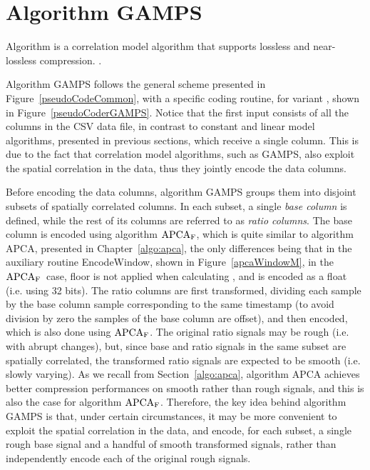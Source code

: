 
\section{Algorithm GAMPS}
\label{algo:gamps}
\newcommand{\apcaF}{$\textnormal{APCA}_\textnormal{F}$}


\vspace{-5pt}
Algorithm \textit{\GAMPSfull} \cite{coder:gamps} is a correlation model algorithm that supports lossless and near-lossless compression. \WindowParam {}.


Algorithm GAMPS follows the general scheme presented in Figure~\ref{pseudoCodeCommon}, with a specific coding routine, for variant \maskalgo, shown in Figure~\ref{pseudoCoderGAMPS}. Notice that the first input consists of all the columns in the CSV data file, in contrast to constant and linear model algorithms, presented in previous sections, which receive a single column. This is due to the fact that correlation model algorithms, such as GAMPS, also exploit the spatial correlation in the data, thus they jointly encode the data columns. 


Before encoding the data columns, algorithm GAMPS groups them into disjoint subsets of spatially correlated columns. In each subset, a single \textit{base column} is defined, while the rest of its columns are referred to as \textit{ratio columns}.  The base column is encoded using algorithm \apcaF, which is quite similar to algorithm APCA, presented in Chapter~\ref{algo:apca}, the only differences being that in the auxiliary routine EncodeWindow, shown in Figure~\ref{apcaWindowM}, in the \apcaF\ case, floor is not applied when calculating \midrange, and \midrange is encoded as a float (i.e. using 32 bits). The ratio columns are first transformed, dividing each sample by the base column sample corresponding to the same timestamp (to avoid division by zero the samples of the base column are offset), and then encoded, which is also done using \apcaF. The original ratio signals may be rough (i.e. with abrupt changes), but, since base and ratio signals in the same subset are spatially correlated, the transformed ratio signals are expected to be smooth (i.e. slowly varying). As we recall from Section~\ref{algo:apca}, algorithm APCA achieves better compression performances on smooth rather than rough signals, and this is also the case for algorithm \apcaF. Therefore, the key idea behind algorithm GAMPS is that, under certain circumstances, it may be more convenient to exploit the spatial correlation in the data, and encode, for each subset, a single rough base signal and a handful of smooth transformed signals, rather than independently encode each of the original rough signals.


